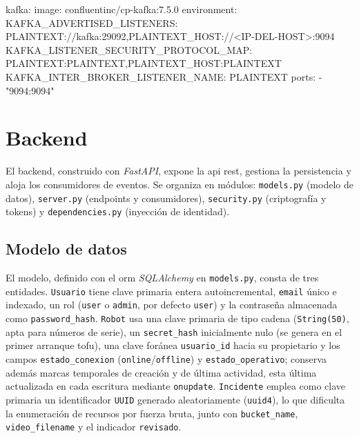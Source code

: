 %
\begin{yamlcode}[title={Listeners del broker Kafka (docker-compose.yml)}, label={lst:kafka}]
kafka:
  image: confluentinc/cp-kafka:7.5.0
  environment:
    KAFKA_ADVERTISED_LISTENERS: PLAINTEXT://kafka:29092,PLAINTEXT_HOST://<IP-DEL-HOST>:9094
    KAFKA_LISTENER_SECURITY_PROTOCOL_MAP: PLAINTEXT:PLAINTEXT,PLAINTEXT_HOST:PLAINTEXT
    KAFKA_INTER_BROKER_LISTENER_NAME: PLAINTEXT
  ports:
    - "9094:9094"
\end{yamlcode}%

\section{Backend}
\label{sec:backend}

El backend, construido con \textit{FastAPI}, expone la \gls{api} \gls{rest},
gestiona la persistencia y aloja los consumidores de eventos. Se organiza en
módulos: \texttt{models.py} (modelo de datos), \texttt{server.py} (endpoints y
consumidores), \texttt{security.py} (criptografía y tokens) y
\texttt{dependencies.py} (inyección de identidad).

\subsection{Modelo de datos}
\label{sec:modelo-datos}

El modelo, definido con el \gls{orm} \textit{SQLAlchemy} en \texttt{models.py},
consta de tres entidades. \texttt{Usuario} tiene clave primaria entera
autoincremental, \texttt{email} único e indexado, un rol (\texttt{user} o
\texttt{admin}, por defecto \texttt{user}) y la contraseña almacenada como
\texttt{password\_hash}. \texttt{Robot} usa una clave primaria de tipo cadena
(\texttt{String(50)}, apta para números de serie), un \texttt{secret\_hash}
inicialmente nulo (se genera en el primer arranque \gls{tofu}), una clave foránea
\texttt{usuario\_id} hacia su propietario y los campos \texttt{estado\_conexion}
(\texttt{online}/\texttt{offline}) y \texttt{estado\_operativo}; conserva además
marcas temporales de creación y de última actividad, esta última actualizada en cada
escritura mediante \texttt{onupdate}. \texttt{Incidente} emplea como clave primaria un
identificador \texttt{UUID} generado aleatoriamente (\texttt{uuid4}), lo que dificulta
la enumeración de recursos por fuerza bruta, junto con \texttt{bucket\_name},
\texttt{video\_filename} y el indicador \texttt{revisado}.

